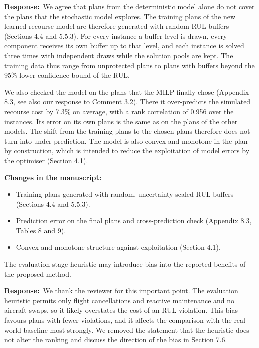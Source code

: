 \documentclass{article}
\newcommand{\response}{\vspace{0.1cm}\noindent\underline{\textbf{Response:}}\ }
\newcommand{\changes}{\vspace{0.1cm}\noindent\textbf{Changes in the manuscript:}}
\begin{document}
\response We agree that plans from the deterministic model alone do not cover the plans that the stochastic model explores. The training plans of the new learned recourse model are therefore generated with random RUL buffers (Sections 4.4 and 5.5.3). For every instance a buffer level is drawn, every component receives its own buffer up to that level, and each instance is solved three times with independent draws while the solution pools are kept. The training data thus range from unprotected plans to plans with buffers beyond the 95\% lower confidence bound of the RUL.

We also checked the model on the plans that the MILP finally chose (Appendix 8.3, see also our response to Comment 3.2). There it over-predicts the simulated recourse cost by 7.3\% on average, with a rank correlation of 0.956 over the instances. Its error on its own plans is the same as on the plans of the other models. The shift from the training plans to the chosen plans therefore does not turn into under-prediction. The model is also convex and monotone in the plan by construction, which is intended to reduce the exploitation of model errors by the optimiser (Section 4.1).

\changes
\begin{itemize}[nosep]
\item Training plans generated with random, uncertainty-scaled RUL buffers (Sections 4.4 and 5.5.3).
\item Prediction error on the final plans and cross-prediction check (Appendix 8.3, Tables 8 and 9).
\item Convex and monotone structure against exploitation (Section 4.1).
\end{itemize}

\begin{cmt}{}{}
The evaluation-stage heuristic may introduce bias into the reported benefits of the proposed method.
\end{cmt}

\response We thank the reviewer for this important point. The evaluation heuristic permits only flight cancellations and reactive maintenance and no aircraft swaps, so it likely overstates the cost of an RUL violation. This bias favours plans with fewer violations, and it affects the comparison with the real-world baseline most strongly. We removed the statement that the heuristic does not alter the ranking and discuss the direction of the bias in Section 7.6.
\end{document}
